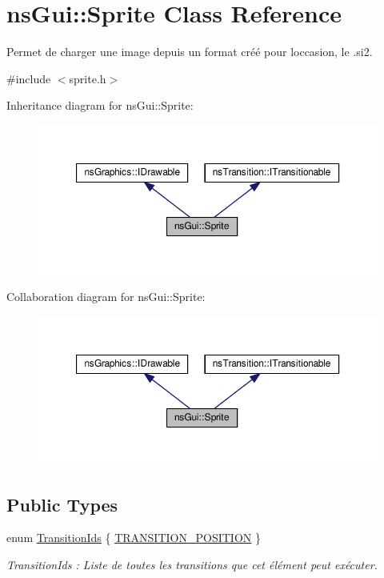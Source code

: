 \hypertarget{classns_gui_1_1_sprite}{}\section{ns\+Gui\+:\+:Sprite Class Reference}
\label{classns_gui_1_1_sprite}


Permet de charger une image depuis un format créé pour l\textquotesingle{}occasion, le .si2.  




{\ttfamily \#include $<$sprite.\+h$>$}



Inheritance diagram for ns\+Gui\+:\+:Sprite\+:
\nopagebreak
\begin{figure}[H]
\begin{center}
\leavevmode
\includegraphics[width=350pt]{classns_gui_1_1_sprite__inherit__graph}
\end{center}
\end{figure}


Collaboration diagram for ns\+Gui\+:\+:Sprite\+:
\nopagebreak
\begin{figure}[H]
\begin{center}
\leavevmode
\includegraphics[width=350pt]{classns_gui_1_1_sprite__coll__graph}
\end{center}
\end{figure}
\subsection*{Public Types}
\begin{DoxyCompactItemize}
\item 
enum \hyperlink{classns_gui_1_1_sprite_a09069244e6b3e580f8511496c7ae1b78}{Transition\+Ids} \{ \hyperlink{classns_gui_1_1_sprite_a09069244e6b3e580f8511496c7ae1b78a90092e9cd093f4ef21dab0a68fbe6c54}{T\+R\+A\+N\+S\+I\+T\+I\+O\+N\+\_\+\+P\+O\+S\+I\+T\+I\+ON}
 \}\begin{DoxyCompactList}\small\item\em Transition\+Ids \+: Liste de toutes les transitions que cet élément peut exécuter. \end{DoxyCompactList}
\end{DoxyCompactItemize}
